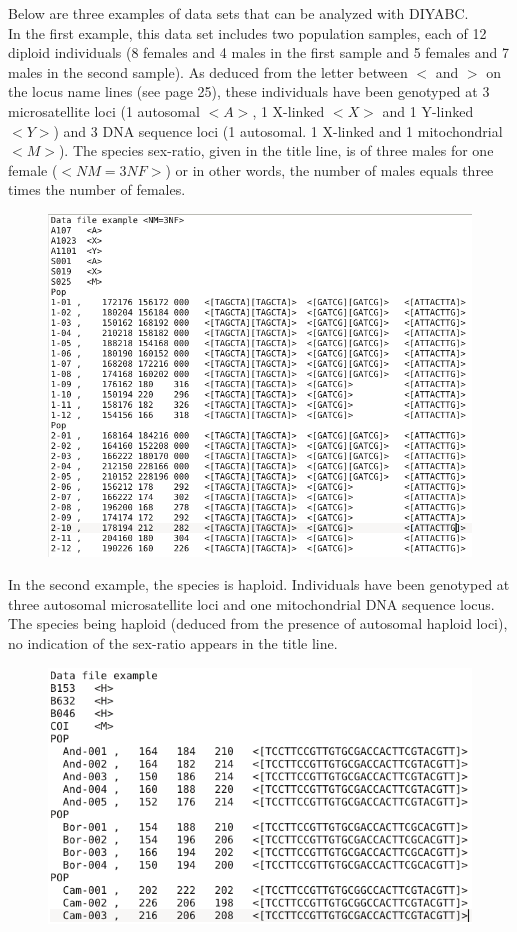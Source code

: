  
Below are three examples of data sets that can be analyzed with DIYABC.\\ In the first example, this data set includes two population samples, each of 12 diploid individuals (8 females and 4 males in the first sample and 5 females and 7 males in the second sample). As deduced from the letter between $<$ and $>$ on the locus name lines (see page 25), these individuals have been genotyped at 3 microsatellite loci (1 autosomal $<A>$, 1 X-linked $<X>$ and 1 Y-linked $<Y>$) and 3 DNA sequence loci (1 autosomal. 1 X-linked and 1 mitochondrial $<M>$). The species sex-ratio, given in the title line, is of three males for one female ($<NM=3NF>$) or in other words, the number of males equals three times the number of females. 
\begin{figure}[h]
\includegraphics[scale=0.6]{gui_pictures/screenga001.png}
\end{figure}
\newpage
In the second example, the species is haploid. Individuals have been genotyped at three autosomal microsatellite loci and one mitochondrial DNA sequence locus. The species being haploid (deduced from the presence of autosomal haploid loci), no indication of the sex-ratio appears in the title line.

\begin{figure}[h]
\includegraphics[scale=0.6]{gui_pictures/screenga002.png}
\end{figure}

